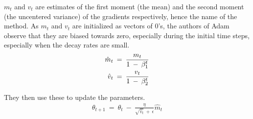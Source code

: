 $m_t$ and $v_t$ are estimates of the first moment (the mean) and the second moment (the uncentered variance) of the gradients respectively, hence the name of the method. As $m_t$ and $v_t$ are initialized as vectors of 0's, the authors of Adam observe that they are biased towards zero, especially during the initial time steps, especially when the decay rates are small.
\begin{align}
    \hat{m}_t \: = \: \frac{m_t}{1\:-\:\beta^t_1} \\
 \hat{v}_t \: = \: \frac{v_t}{1\: - \: \beta^t_2} \notag
\end{align}



They then use these to update the parameters.
\begin{align}
\theta_{t+1} \: = \: \theta_t \: - \: \frac{\eta}{\sqrt{\hat{v}_t} \: +\: \epsilon} \hat{m}_t
\end{align}
